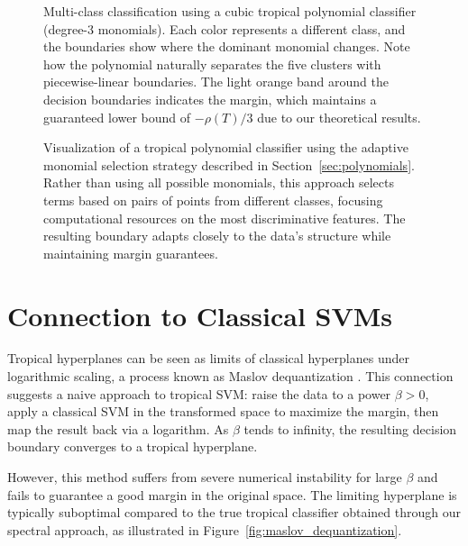 \documentclass{article}
\begin{document}
\vspace*{2em}
\begin{figure}[ht!]
    \centering
    \resizebox{0.9\textwidth}{!}{\clipbox{0.15\width{} 0.30\height{} 0.15\width{} 0.30\height{}}{}}
    \caption{Multi-class classification using a cubic tropical polynomial classifier (degree-3 monomials). Each color represents a different class, and the boundaries show where the dominant monomial changes. Note how the polynomial naturally separates the five clusters with piecewise-linear boundaries. The light orange band around the decision boundaries indicates the margin, which maintains a guaranteed lower bound of $-\rho(T)/3$ due to our theoretical results.}
    \label{fig:homogeneous_selection}
\end{figure}
\vspace*{4em}
\begin{figure}[ht!]
    \centering
    \resizebox{0.9\textwidth}{!}{\clipbox{0.15\width{} 0.30\height{} 0.15\width{} 0.30\height{}}{}}
    \caption{Visualization of a tropical polynomial classifier using the adaptive monomial selection strategy described in Section~\ref{sec:polynomials}. Rather than using all possible monomials, this approach selects terms based on pairs of points from different classes, focusing computational resources on the most discriminative features. The resulting boundary adapts closely to the data's structure while maintaining margin guarantees.}
    \label{fig:adaptive_polynomial}
\end{figure}
\vspace*{2em}


\newpage
\section{Connection to Classical SVMs}\label{sec:maslov}
Tropical hyperplanes can be seen as limits of classical hyperplanes under logarithmic scaling, a process known as Maslov dequantization \cite{viro2001}. This connection suggests a naive approach to tropical SVM: raise the data to a power $\beta > 0$, apply a classical SVM in the transformed space to maximize the margin, then map the result back via a logarithm. As $\beta$ tends to infinity, the resulting decision boundary converges to a tropical hyperplane.

However, this method suffers from severe numerical instability for large $\beta$ and fails to guarantee a good margin in the original space. The limiting hyperplane is typically suboptimal compared to the true tropical classifier obtained through our spectral approach, as illustrated in Figure~\ref{fig:maslov_dequantization}.
\end{document}
